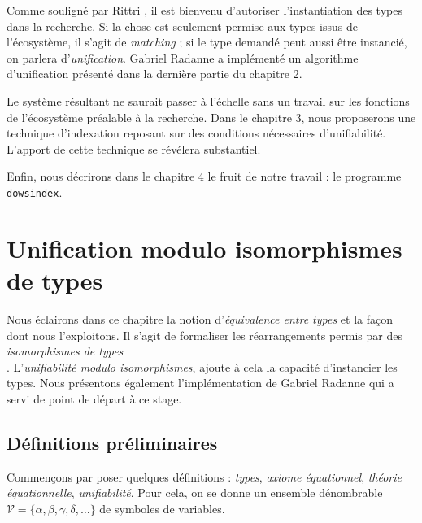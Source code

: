 \documentclass[a4paper]{report}
\theoremstyle{definition}
\newcommand{\dowsindex}{\texttt{dowsindex}\xspace}
\newcommand{\V}{\mathscr{V}}
\newcommand\laure[1]{{\bf\color{WildStrawberry}{TODO: #1}}\\}
\begin{document}
Comme souligné par Rittri \cite{Rittri93}, il est bienvenu d'autoriser l'instantiation des types dans la recherche. Si la chose est seulement permise aux types issus de l'écosystème, il s'agit de \emph{matching} ; si le type demandé peut aussi être instancié, on parlera d'\emph{unification}. Gabriel Radanne a implémenté un algorithme d'unification présenté dans la dernière partie du chapitre 2.

Le système résultant ne saurait passer à l'échelle sans un travail sur les fonctions de l'écosystème préalable à la recherche. Dans le chapitre 3, nous proposerons une technique d'indexation reposant sur des conditions nécessaires d'unifiabilité. L'apport de cette technique se révélera substantiel.

Enfin, nous décrirons dans le chapitre 4 le fruit de notre travail : le programme \dowsindex.


\chapter{Unification modulo isomorphismes de types}

Nous éclairons dans ce chapitre la notion d'\emph{équivalence entre types} et la façon dont nous l'exploitons. Il s'agit de formaliser les réarrangements permis par des \emph{isomorphismes de types} \laure{donner une intuition ici}. L'\emph{unifiabilité modulo isomorphismes}, ajoute à cela la capacité d'instancier les types. Nous présentons également l'implémentation de Gabriel Radanne qui a servi de point de départ à ce stage.



\section{Définitions préliminaires}

Commençons par poser quelques définitions : \emph{types}, \emph{axiome équationnel}, \emph{théorie équationnelle}, \emph{unifiabilité}. Pour cela, on se donne un ensemble dénombrable $\V = \{ \alpha, \beta, \gamma, \delta, \dots \}$ de symboles de variables.
\end{document}
